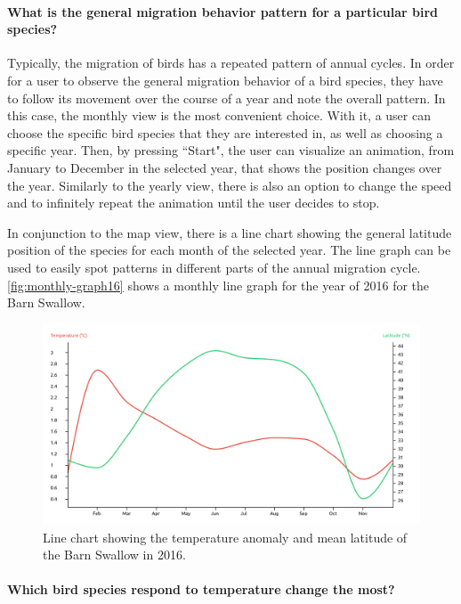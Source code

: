 \documentclass[journal]{vgtc}                %
\begin{document}
\paragraph{What is the general migration behavior pattern for a particular bird species?}

Typically, the migration of birds has a repeated pattern of annual cycles. In order for a user to observe the general migration behavior of a bird species, they have to follow its movement over the course of a year and note the overall pattern. In this case, the monthly view is the most convenient choice. With it, a user can choose the specific bird species that they are interested in, as well as choosing a specific year. Then, by pressing ``Start", the user can visualize an animation, from January to December in the selected year, that shows the position changes over the year. Similarly to the yearly view, there is also an option to change the speed and to infinitely repeat the animation until the user decides to stop.

In conjunction to the map view, there is a line chart showing the general latitude position of the species for each month of the selected year. The line graph can be used to easily spot patterns in different parts of the annual migration cycle. \autoref{fig:monthly-graph16} shows a monthly line graph for the year of 2016 for the Barn Swallow.

\begin{figure}[t]
  \centering
  \includegraphics[width=\linewidth]{monthly-graph16-barnswallow}
    \caption{Line chart showing the temperature anomaly and mean latitude of the Barn Swallow in 2016.}
  \label{fig:monthly-graph16}
\end{figure}

\paragraph{Which bird species respond to temperature change the most?}
\end{document}

